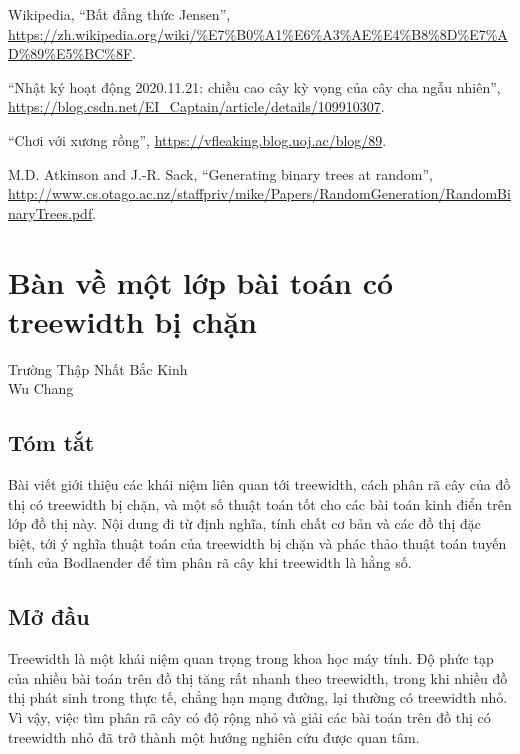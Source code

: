 \documentclass[11pt]{article}
\begin{document}
\begin{enumerate}[label={[\arabic*]}]
  \item Wikipedia, ``Bất đẳng thức Jensen'',
  \url{https://zh.wikipedia.org/wiki/%E7%B0%A1%E6%A3%AE%E4%B8%8D%E7%AD%89%E5%BC%8F}.
  \item ``Nhật ký hoạt động 2020.11.21: chiều cao cây kỳ vọng của cây cha ngẫu
  nhiên'', \url{https://blog.csdn.net/EI_Captain/article/details/109910307}.
  \item ``Chơi với xương rồng'', \url{https://vfleaking.blog.uoj.ac/blog/89}.
  \item M.D. Atkinson and J.-R. Sack, ``Generating binary trees at random'',
  \url{http://www.cs.otago.ac.nz/staffpriv/mike/Papers/RandomGeneration/RandomBinaryTrees.pdf}.
\end{enumerate}

\section{Bàn về một lớp bài toán có treewidth bị chặn}

\begin{center}
Trường Thập Nhất Bắc Kinh\\
Wu Chang
\end{center}

\subsection*{Tóm tắt}

Bài viết giới thiệu các khái niệm liên quan tới treewidth, cách phân rã cây của
đồ thị có treewidth bị chặn, và một số thuật toán tốt cho các bài toán kinh
điển trên lớp đồ thị này. Nội dung đi từ định nghĩa, tính chất cơ bản và các
đồ thị đặc biệt, tới ý nghĩa thuật toán của treewidth bị chặn và phác thảo
thuật toán tuyến tính của Bodlaender để tìm phân rã cây khi treewidth là hằng
số.

\subsection{Mở đầu}

Treewidth là một khái niệm quan trọng trong khoa học máy tính. Độ phức tạp của
nhiều bài toán trên đồ thị tăng rất nhanh theo treewidth, trong khi nhiều đồ
thị phát sinh trong thực tế, chẳng hạn mạng đường, lại thường có treewidth nhỏ.
Vì vậy, việc tìm phân rã cây có độ rộng nhỏ và giải các bài toán trên đồ thị có
treewidth nhỏ đã trở thành một hướng nghiên cứu được quan tâm.
\end{document}
